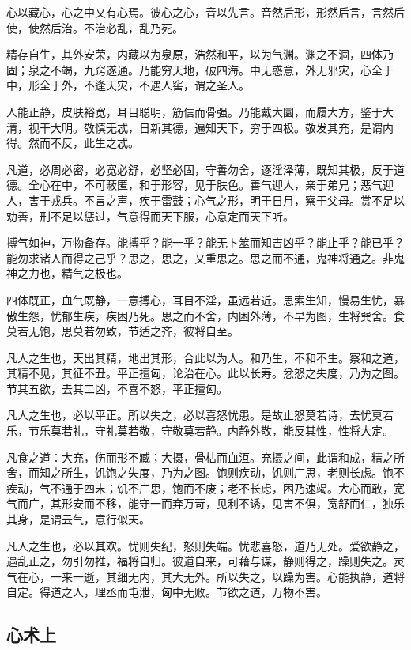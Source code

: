 心以藏心，心之中又有心焉。彼心之心，音以先言。音然后形，形然后言，言然后使，使然后治。不治必乱，乱乃死。

精存自生，其外安荣，内藏以为泉原，浩然和平，以为气渊。渊之不涸，四体乃固；泉之不竭，九窍遂通。乃能穷天地，破四海。中无惑意，外无邪灾，心全于中，形全于外，不逢天灾，不遇人窖，谓之圣人。

人能正静，皮肤裕宽，耳目聪明，筋信而骨强。乃能戴大圜，而履大方，鉴于大清，视干大明。敬慎无忒，日新其德，遍知天下，穷于四极。敬发其充，是谓内得。然而不反，此生之忒。

凡道，必周必密，必宽必舒，必坚必固，守善勿舍，逐淫泽薄，既知其极，反于道德。全心在中，不可蔽匿，和于形容，见于肤色。善气迎人，亲于弟兄；恶气迎人，害于戎兵。不言之声，疾于雷鼓；心气之形，明于日月，察于父母。赏不足以劝善，刑不足以惩过，气意得而天下服，心意定而天下听。

搏气如神，万物备存。能搏乎？能一乎？能无卜筮而知吉凶乎？能止乎？能已乎？能勿求诸人而得之己乎？思之，思之，又重思之。思之而不通，鬼神将通之。非鬼神之力也，精气之极也。

四体既正，血气既静，一意搏心，耳目不淫，虽远若近。思索生知，慢易生忧，暴傲生怨，忧郁生疾，疾困乃死。思之而不舍，内困外薄，不早为图，生将巽舍。食莫若无饱，思莫若勿致，节适之齐，彼将自至。

凡人之生也，天出其精，地出其形，合此以为人。和乃生，不和不生。察和之道，其精不见，其征不丑。平正擅匈，论治在心。此以长寿。忿怒之失度，乃为之图。节其五欲，去其二凶，不喜不怒，平正擅匈。

凡人之生也，必以平正。所以失之，必以喜怒忧患。是故止怒莫若诗，去忧莫若乐，节乐莫若礼，守礼莫若敬，守敬莫若静。内静外敬，能反其性，性将大定。

凡食之道：大充，伤而形不臧；大摄，骨枯而血沍。充摄之间，此谓和成，精之所舍，而知之所生，饥饱之失度，乃为之图。饱则疾动，饥则广思，老则长虑。饱不疾动，气不通于四末；饥不广思，饱而不废；老不长虑，困乃速竭。大心而敢，宽气而广，其形安而不移，能守一而弃万苛，见利不诱，见害不俱，宽舒而仁，独乐其身，是谓云气，意行似天。

凡人之生也，必以其欢。忧则失纪，怒则失端。忧悲喜怒，道乃无处。爱欲静之，遇乱正之，勿引勿推，福将自归。彼道自来，可藉与谋，静则得之，躁则失之。灵气在心，一来一逝，其细无内，其大无外。所以失之，以躁为害。心能执静，道将自定。得道之人，理丞而屯泄，匈中无败。节欲之道，万物不害。

\subsection{心术上}

